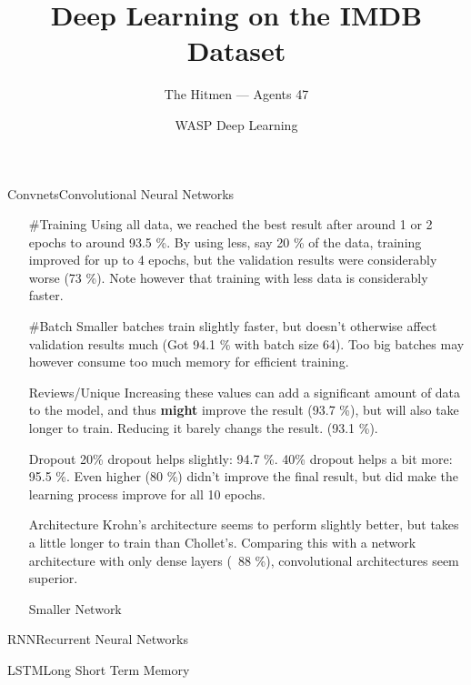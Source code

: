 \documentclass{beamer}
\title{Deep Learning on the IMDB Dataset}
\date{WASP Deep Learning}
\author[Agents 47]{The Hitmen --- Agents 47}
\begin{document}
\begin{frame}
  \titlepage
\end{frame}


\begin{frame}{Convnets}{Convolutional Neural Networks}

\begin{itemize}

\item[#Training] Using all data, we reached the best result after around 1 or 2
  epochs to around 93.5 \%. By using less, say 20 \% of the data, training
  improved for up to 4 epochs, but the validation results were considerably
  worse (73 \%). Note however that training with less data is considerably
  faster.
  
\item[#Batch] Smaller batches train slightly faster, but doesn't otherwise
  affect validation results much (Got 94.1 \% with batch size 64). Too big
  batches may however consume too much memory for efficient training.

\item[Reviews/Unique] Increasing these values can add a significant amount of
  data to the model, and thus \textbf{might} improve the result (93.7 \%), but
  will also take longer to train. Reducing it barely changs the result. (93.1
  \%).
 
\item[Dropout] 20\% dropout helps slightly: 94.7 \%.  40\% dropout helps a bit
  more: 95.5 \%. Even higher (80 \%) didn't improve the final result, but did
  make the learning process improve for all 10 epochs.

\item[Architecture] Krohn's architecture seems to perform slightly better, but
  takes a little longer to train than Chollet's. Comparing this with a network
  architecture with only dense layers (~88 \%), convolutional architectures seem
  superior.

\item[Smaller Network]
  
\end{itemize}
  
\end{frame}


\begin{frame}{RNN}{Recurrent Neural Networks}
  
\end{frame}

\begin{frame}{LSTM}{Long Short Term Memory}
  
\end{frame}
\end{document}

